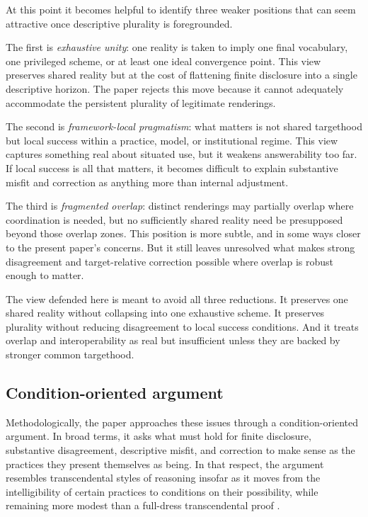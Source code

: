 \documentclass[11pt]{article}
\renewcommand{\emph}[1]{\textit{#1}}
\begin{document}
At this point it becomes helpful to identify three weaker positions that can seem attractive once descriptive plurality is foregrounded.

The first is \emph{exhaustive unity}: one reality is taken to imply one final vocabulary, one privileged scheme, or at least one ideal convergence point. This view preserves shared reality but at the cost of flattening finite disclosure into a single descriptive horizon. The paper rejects this move because it cannot adequately accommodate the persistent plurality of legitimate renderings.

The second is \emph{framework-local pragmatism}: what matters is not shared targethood but local success within a practice, model, or institutional regime. This view captures something real about situated use, but it weakens answerability too far. If local success is all that matters, it becomes difficult to explain substantive misfit and correction as anything more than internal adjustment.

The third is \emph{fragmented overlap}: distinct renderings may partially overlap where coordination is needed, but no sufficiently shared reality need be presupposed beyond those overlap zones. This position is more subtle, and in some ways closer to the present paper's concerns. But it still leaves unresolved what makes strong disagreement and target-relative correction possible where overlap is robust enough to matter.

The view defended here is meant to avoid all three reductions. It preserves one shared reality without collapsing into one exhaustive scheme. It preserves plurality without reducing disagreement to local success conditions. And it treats overlap and interoperability as real but insufficient unless they are backed by stronger common targethood.

\subsection{Condition-oriented argument}

Methodologically, the paper approaches these issues through a condition-oriented argument. In broad terms, it asks what must hold for finite disclosure, substantive disagreement, descriptive misfit, and correction to make sense as the practices they present themselves as being. In that respect, the argument resembles transcendental styles of reasoning insofar as it moves from the intelligibility of certain practices to conditions on their possibility, while remaining more modest than a full-dress transcendental proof \cite{Stern2011TranscendentalArgumentsSEP}.
\end{document}
